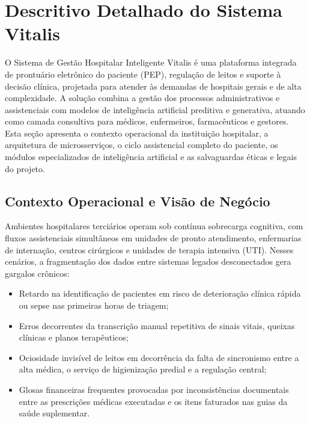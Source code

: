 
\section{Descritivo Detalhado do Sistema Vitalis}
\label{sec:descritivo}

O Sistema de Gestão Hospitalar Inteligente Vitalis é uma plataforma integrada de prontuário eletrônico do paciente (PEP), regulação de leitos e suporte à decisão clínica, projetada para atender às demandas de hospitais gerais e de alta complexidade. A solução combina a gestão dos processos administrativos e assistenciais com modelos de inteligência artificial preditiva e generativa, atuando como camada consultiva para médicos, enfermeiros, farmacêuticos e gestores. Esta seção apresenta o contexto operacional da instituição hospitalar, a arquitetura de microsserviços, o ciclo assistencial completo do paciente, os módulos especializados de inteligência artificial e as salvaguardas éticas e legais do projeto.

\subsection{Contexto Operacional e Visão de Negócio}
\label{subsec:contexto_negocio}

Ambientes hospitalares terciários operam sob contínua sobrecarga cognitiva, com fluxos assistenciais simultâneos em unidades de pronto atendimento, enfermarias de internação, centros cirúrgicos e unidades de terapia intensiva (UTI). Nesses cenários, a fragmentação dos dados entre sistemas legados desconectados gera gargalos crônicos:

\begin{itemize}
    \item Retardo na identificação de pacientes em risco de deterioração clínica rápida ou sepse nas primeiras horas de triagem;
    \item Erros decorrentes da transcrição manual repetitiva de sinais vitais, queixas clínicas e planos terapêuticos;
    \item Ociosidade invisível de leitos em decorrência da falta de sincronismo entre a alta médica, o serviço de higienização predial e a regulação central;
    \item Glosas financeiras frequentes provocadas por inconsistências documentais entre as prescrições médicas executadas e os itens faturados nas guias da saúde suplementar.
\end{itemize}

